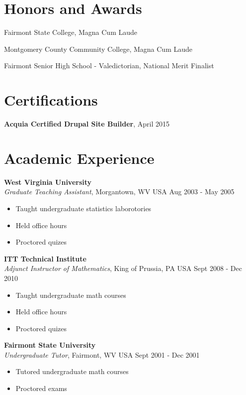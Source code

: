\documentclass[margin,line]{res}
\begin{document}
\begin{resume}
\vspace*{0.2in}
\section{\sc Honors and Awards} 

\vspace*{-2.5mm}
Fairmont State College, Magna Cum Laude

\vspace*{-2.5mm}
Montgomery County Community College, Magna Cum Laude

\vspace*{-2.5mm}
Fairmont Senior High School - Valedictorian, National Merit Finalist

\section{\sc Certifications} 
{\bf Acquia Certified Drupal Site Builder}, April 2015

\section{\sc Academic Experience}
{\bf West Virginia University} \\
{\em Graduate Teaching Assistant}, Morgantown, WV USA \hfill Aug 2003 - May 2005
\begin{itemize}
\item Taught undergraduate statistics laborotories
\item Held office hours
\item Proctored quizes 
\end{itemize}

{\bf ITT Technical Institute} \\
{\em Adjunct Instructor of Mathematics}, King of Prussia, PA USA \hfill Sept 2008 - Dec 2010
\begin{itemize}
\item Taught undergraduate math courses
\item Held office hours
\item Proctored quizes
\end{itemize}

{\bf Fairmont State University} \\
{\em Undergraduate Tutor}, Fairmont, WV USA \hfill Sept 2001 - Dec 2001
\begin{itemize}
\item Tutored undergraduate math courses
\item Proctored exams
\end{itemize}




\end{resume}
\end{document}
